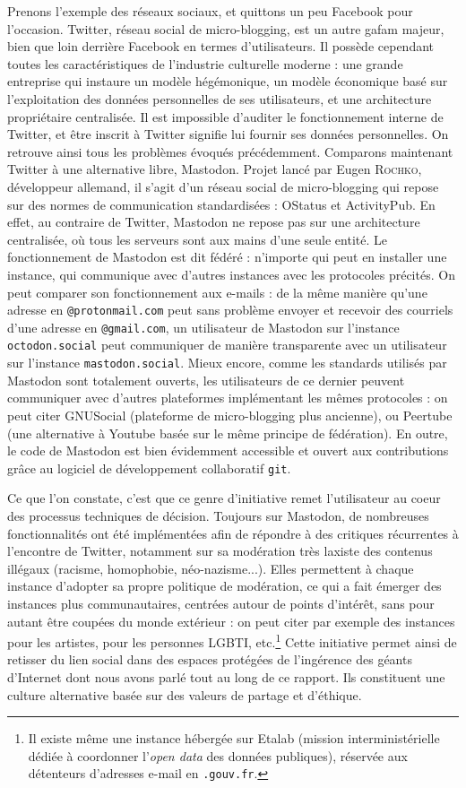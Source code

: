 \documentclass[a4paper,12pt]{report}
\begin{document}
Prenons l'exemple des réseaux sociaux, et quittons un peu Facebook pour l'occasion. Twitter, réseau social de micro-blogging, est un autre \gls{gafam} majeur, bien que loin derrière Facebook en termes d'utilisateurs. Il possède cependant toutes les caractéristiques de l'industrie culturelle moderne : une grande entreprise qui instaure un modèle hégémonique, un modèle économique basé sur l'exploitation des données personnelles de ses utilisateurs, et une architecture propriétaire centralisée. Il est impossible d'auditer le fonctionnement interne de Twitter, et être inscrit à Twitter signifie lui fournir ses données personnelles. On retrouve ainsi tous les problèmes évoqués précédemment. Comparons maintenant Twitter à une alternative libre, Mastodon. Projet lancé par Eugen \textsc{Rochko}, développeur allemand, il s'agit d'un réseau social de micro-blogging qui repose sur des normes de communication standardisées : OStatus et ActivityPub. En effet, au contraire de Twitter, Mastodon ne repose pas sur une architecture centralisée, où tous les serveurs sont aux mains d'une seule entité. Le fonctionnement de Mastodon est dit fédéré : n'importe qui peut en installer une instance, qui communique avec d'autres instances avec les protocoles précités. On peut comparer son fonctionnement aux e-mails : de la même manière qu'une adresse en \texttt{@protonmail.com} peut sans problème envoyer et recevoir des courriels d'une adresse en \texttt{@gmail.com}, un utilisateur de Mastodon sur l'instance \texttt{octodon.social} peut communiquer de manière transparente avec un utilisateur sur l'instance \texttt{mastodon.social}. Mieux encore, comme les standards utilisés par Mastodon sont totalement ouverts, les utilisateurs de ce dernier peuvent communiquer avec d'autres plateformes implémentant les mêmes protocoles : on peut citer GNUSocial (plateforme de micro-blogging plus ancienne), ou Peertube (une alternative à Youtube basée sur le même principe de fédération). En outre, le code de Mastodon est bien évidemment accessible et ouvert aux contributions grâce au logiciel de développement collaboratif \texttt{git}. 

Ce que l'on constate, c'est que ce genre d'initiative remet l'utilisateur au coeur des processus techniques de décision. Toujours sur Mastodon, de nombreuses fonctionnalités ont été implémentées afin de répondre à des critiques récurrentes à l'encontre de Twitter, notamment sur sa modération très laxiste des contenus illégaux (racisme, homophobie, néo-nazisme...). Elles permettent à chaque instance d'adopter sa propre politique de modération, ce qui a fait émerger des instances plus communautaires, centrées autour de points d'intérêt, sans pour autant être coupées du monde extérieur : on peut citer par exemple des instances pour les artistes, pour les personnes LGBTI, etc.\footnote{Il existe même une instance hébergée sur Etalab (mission interministérielle dédiée à coordonner l'\textit{open data} des données publiques), réservée aux détenteurs d'adresses e-mail en \texttt{.gouv.fr}.} Cette initiative permet ainsi de retisser du lien social dans des espaces protégées de l'ingérence des géants d'Internet dont nous avons parlé tout au long de ce rapport. Ils constituent une culture alternative basée sur des valeurs de partage et d'éthique.
\end{document}
